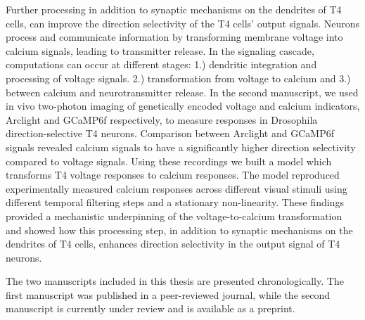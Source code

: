 Further processing in addition to synaptic mechanisms on the dendrites of T4 cells, can improve the direction selectivity of the T4 cells' output signals. Neurons process and communicate information by transforming membrane voltage into calcium signals, leading to transmitter release. In the signaling cascade, computations can occur at different stages: 1.) dendritic integration and processing of voltage signals. 2.) transformation from voltage to calcium and 3.) between calcium and neurotransmitter release. In the second manuscript, we used in vivo two-photon imaging of genetically encoded voltage and calcium indicators, Arclight and GCaMP6f respectively, to measure responses in Drosophila direction-selective T4 neurons. Comparison between Arclight and GCaMP6f signals revealed calcium signals to have a significantly higher direction selectivity compared to voltage signals. Using these recordings we built a model which transforms T4 voltage responses to calcium responses. The model reproduced experimentally measured calcium responses across different visual stimuli using different temporal filtering steps and a stationary non-linearity. These findings provided a mechanistic underpinning of the voltage-to-calcium transformation and showed how this processing step, in addition to synaptic mechanisms on the dendrites of T4 cells, enhances direction selectivity in the output signal of T4 neurons.

The two manuscripts included in this thesis are presented chronologically. The first manuscript was published in a peer-reviewed journal, while the second manuscript is currently under review and is available as a preprint. 


% 


\vfill


\endgroup			

\vfill


